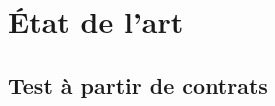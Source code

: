 \section{État de l'art}
\label{section:language:state_of_the_art}

\subsection{Test à partir de contrats}
\label{subsection:language:contract-based_testing}
